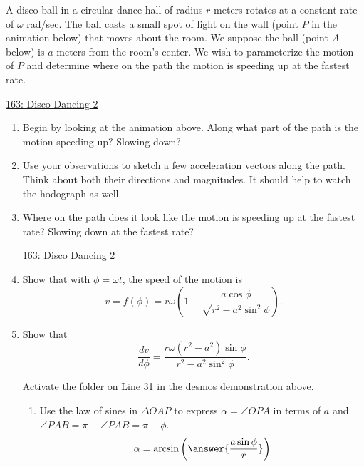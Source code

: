 \documentclass{ximera}
\begin{document}
\begin{question}  \label{Q6756456443gg}
A disco ball in a circular dance hall of radius $r$ meters rotates at a constant rate of $\omega$ rad/sec. The ball casts a small spot of light on the wall (point $P$ in the animation below) that moves about the room. We suppose the ball (point $A$ below) is $a$ meters from the room's center.  We wish to parameterize the motion of $P$ and determine where on the path the motion is speeding up at the fastest rate.

\begin{onlineOnly}
    \begin{center}
\end{center}
\end{onlineOnly}

\href{https://www.geogebra.org/classic/m38mqcpa}{163: Disco Dancing 2}

\begin{enumerate}
\item Begin by looking at the animation above. Along what part of the path is the motion speeding up? Slowing down?

\item Use your observations to sketch a few acceleration vectors along the path. Think about both their directions and magnitudes. It should help to watch the hodograph as well.

\item Where on the path does it look like the motion is speeding up at the fastest rate? Slowing down at the fastest rate?

\begin{onlineOnly}
    \begin{center}
\end{center}
\end{onlineOnly}

\href{https://www.desmos.com/calculator/vtjgmmjt5c}{163: Disco Dancing 2}

\item Show that with $\phi = \omega t$, the speed of the motion is
\[
     v = f(\phi) = r \omega \left( 1- \frac{a\cos\phi}{\sqrt{r^2-a^2\sin^2\phi}}   \right) .
\]

\item Show that
\[
      \frac{dv}{d \phi} = \frac{ r\omega(r^2-a^2)\sin\phi}{r^2- a^2\sin^2\phi} .
\]

\begin{hint}
Activate the folder on Line 31 in the desmos demonstration above. 
\begin{enumerate}
\item Use the law of sines in $\Delta OAP$ to express $\alpha = \angle OPA$ in terms of $a$ and $\angle PAB = \pi - \angle PAB =  \pi -\phi$.
\[
   \alpha  = \arcsin \left( \answer{\frac{a\sin \phi}{r}} \right)
\]


\end{enumerate}
\end{hint}
\end{enumerate}
\end{question}
\end{document}
